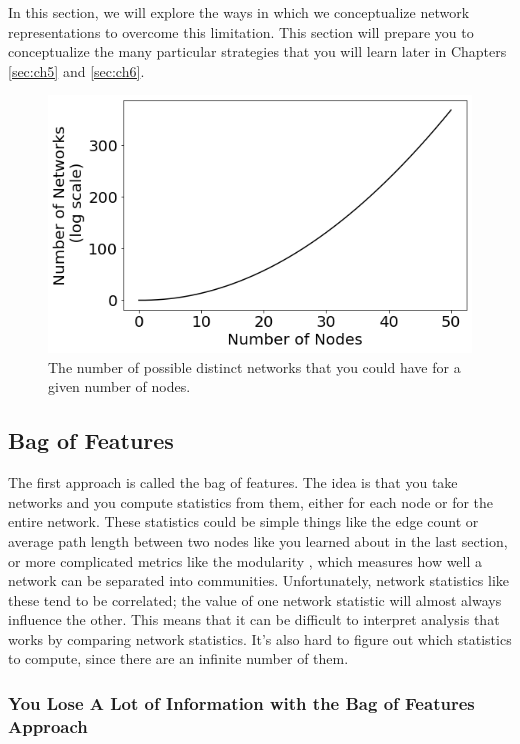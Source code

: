 In this section, we will explore the ways in which we conceptualize network representations to overcome this limitation. This section will prepare you to conceptualize the many particular strategies that you will learn later in Chapters \ref{sec:ch5} and \ref{sec:ch6}.

\begin{figure}[h]
    \centering
    \includegraphics[width=0.7\linewidth]{representations/ch4/Images/nnets.png}
    \caption[Number of networks for $n$ nodes]{The number of possible distinct networks that you could have for a given number of nodes.}
    \label{fig:ch4:nnets}
\end{figure}

\subsection{Bag of Features}

The first approach is called the bag of features. The idea is that you take networks and you compute statistics from them, either for each node or for the entire network. These statistics could be simple things like the edge count or average path length between two nodes like you learned about in the last section, or more complicated metrics like the modularity \cite{Newman2006Jun}, which measures how well a network can be separated into communities. Unfortunately, network statistics like these tend to be correlated; the value of one network statistic will almost always influence the other. This means that it can be difficult to interpret analysis that works by comparing network statistics. It's also hard to figure out which statistics to compute, since there are an infinite number of them.

\subsubsection{You Lose A Lot of Information with the Bag of Features Approach}

